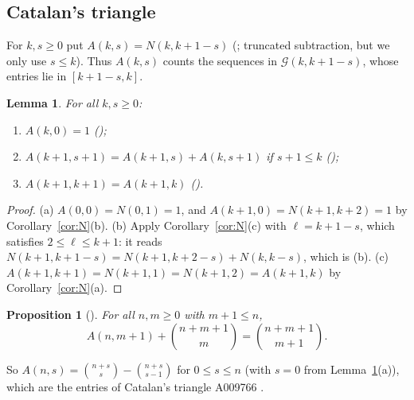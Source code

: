 \documentclass[11pt]{amsart}
\theoremstyle{plain}
\newtheorem{lemma}[theorem]{Lemma}
\newtheorem{proposition}[theorem]{Proposition}
\theoremstyle{definition}
\newcommand{\G}{\mathcal{G}}
\begin{document}
\subsection{Catalan's triangle}
For $k,s\ge0$ put $A(k,s)=N(k,k+1-s)$ (; truncated subtraction, but we only use $s\le k$). Thus $A(k,s)$ counts the sequences in $\G(k,k+1-s)$, whose entries lie in $[k+1-s,k]$.

\begin{lemma}\label{lem:A}
For all $k,s\ge0$:
\begin{enumerate}
\item[(a)] $A(k,0)=1$ \quad();
\item[(b)] $A(k+1,s+1)=A(k+1,s)+A(k,s+1)$ if $s+1\le k$ \quad();
\item[(c)] $A(k+1,k+1)=A(k+1,k)$ \quad().
\end{enumerate}
\end{lemma}

\begin{proof}
(a) $A(0,0)=N(0,1)=1$, and $A(k+1,0)=N(k+1,k+2)=1$ by Corollary~\ref{cor:N}(b). (b) Apply Corollary~\ref{cor:N}(c) with $\ell=k+1-s$, which satisfies $2\le\ell\le k+1$: it reads $N(k+1,k+1-s)=N(k+1,k+2-s)+N(k,k-s)$, which is (b). (c) $A(k+1,k+1)=N(k+1,1)=N(k+1,2)=A(k+1,k)$ by Corollary~\ref{cor:N}(a).
\end{proof}

\begin{proposition}[]\label{prop:ballot}
For all $n,m\ge0$ with $m+1\le n$,
\[
  A(n,m+1)+\binom{n+m+1}{m}=\binom{n+m+1}{m+1}.
\]
\end{proposition}

So $A(n,s)=\binom{n+s}{s}-\binom{n+s}{s-1}$ for $0\le s\le n$ (with $s=0$ from Lemma~\ref{lem:A}(a)), which are the entries of Catalan's triangle A009766 \cite{A009766}.
\end{document}

